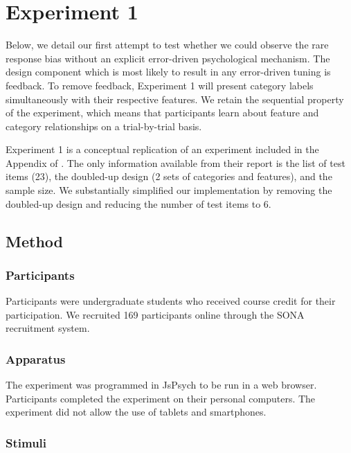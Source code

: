 \documentclass[10pt,letterpaper]{article}
\begin{document}
\section{Experiment 1}

Below, we detail our first attempt to test whether we could observe the rare response bias without an explicit error-driven psychological mechanism.
The design component which is most likely to result in any error-driven tuning is feedback.
To remove feedback, Experiment 1 will present category labels simultaneously with their respective features.
We retain the sequential property of the experiment, which means that participants learn about feature and category relationships on a trial-by-trial basis.

Experiment 1 is a conceptual replication of an experiment included in the Appendix of .
The only information available from their report is the list of test items (23), the doubled-up design (2 sets of categories and features), and the sample size.
We substantially simplified our implementation by removing the doubled-up design and reducing the number of test items to 6.

\subsection{Method}

\subsubsection{Participants}

Participants were undergraduate students who received course credit for their participation.
We recruited 169 participants online through the SONA recruitment system.

\subsubsection{Apparatus}

The experiment was programmed in JsPsych \cite{deleeuw2015JsPsych} to be run in a web browser.
Participants completed the experiment on their personal computers.
The experiment did not allow the use of tablets and smartphones.

\subsubsection{Stimuli}
\end{document}
